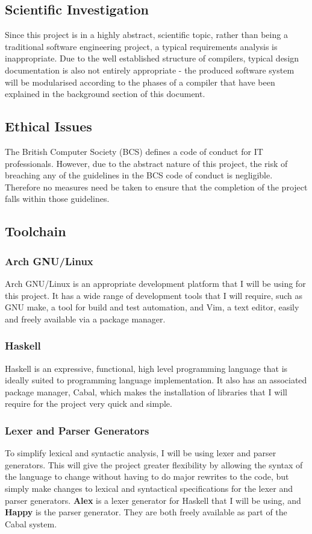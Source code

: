 \documentclass{article}
\begin{document}
\subsection{Scientific Investigation}
Since this project is in a highly abstract, scientific topic, rather than being a traditional software engineering project, a typical requirements analysis is inappropriate. Due to the well established structure of compilers, typical design documentation is also not entirely appropriate - the produced software system will be modularised according to the phases of a compiler that have been explained in the background section of this document.

\subsection{Ethical Issues} %
The British Computer Society (BCS) defines a code of conduct for IT professionals. However, due to the abstract nature of this project, the risk of breaching any of the guidelines in the BCS code of conduct is negligible. Therefore no measures need be taken to ensure that the completion of the project falls within those guidelines.

\subsection{Toolchain}
\subsubsection{Arch GNU/Linux}
Arch GNU/Linux is an appropriate development platform that I will be using for this project. It has a wide range of development tools that I will require, such as GNU make, a tool for build and test automation, and Vim, a text editor, easily and freely available via a package manager.

\subsubsection{Haskell}
Haskell is an expressive, functional, high level programming language that is ideally suited to programming language implementation. It also has an associated package manager, Cabal, which makes the installation of libraries that I will require for the project very quick and simple.

\subsubsection{Lexer and Parser Generators}
To simplify lexical and syntactic analysis, I will be using lexer and parser generators. This will give the project greater flexibility by allowing the syntax of the language to change without having to do major rewrites to the code, but simply make changes to lexical and syntactical specifications for the lexer and parser generators. \textbf{Alex} is a lexer generator for Haskell that I will be using, and \textbf{Happy} is the parser generator. They are both freely available as part of the Cabal system.
\end{document}
